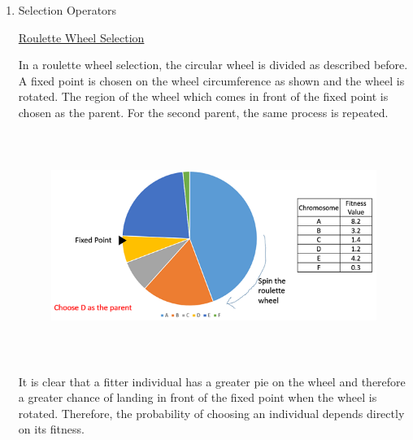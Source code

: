 \documentclass[12pt]{article}
\renewcommand{\_}{\kern-1.5pt\textunderscore\kern-1.5pt}
\begin{document}
\begin{enumerate}
	\item {\fontsize{20pt}{24.0pt}\selectfont Selection Operators\par}\par

{\fontsize{14pt}{16.8pt}\selectfont \uline{Roulette Wheel Selection}\par}\par

\setlength{\parskip}{7.2pt}
\begin{justify}
In a roulette wheel selection, the circular wheel is divided as described before. A fixed point is chosen on the wheel circumference as shown and the wheel is rotated. The region of the wheel which comes in front of the fixed point is chosen as the parent. For the second parent, the same process is repeated.
\end{justify}\par




\begin{figure}[H]
	\begin{Center}
		\includegraphics[width=6.25in,height=2.9in]{./media/image8.png}
	\end{Center}
\end{figure}



\setlength{\parskip}{0.0pt}
\par

\setlength{\parskip}{7.2pt}
\begin{justify}
It is clear that a fitter individual has a greater pie on the wheel and therefore a greater chance of landing in front of the fixed point when the wheel is rotated. Therefore, the probability of choosing an individual depends directly on its fitness.
\end{justify}\par


\end{enumerate}
\end{document}
